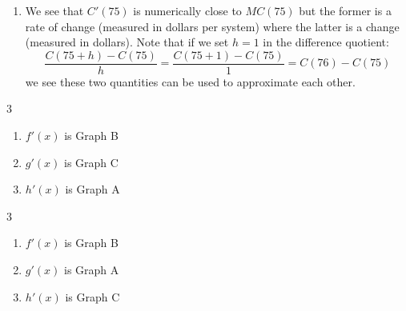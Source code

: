 \documentclass{ximera}
\begin{document}
\begin{enumerate}
\begin{enumerate}
\item  We see that $C'(75)$ is numerically close to $MC(75)$ but the former is a rate of change (measured in dollars per system) where the latter is a change (measured in dollars).  Note that if we set  $h = 1$ in the difference quotient:  \[\frac{C(75+h) - C(75)}{h} = \frac{C(75+1) - C(75)}{1} = C(76) - C(75)\] we see these two quantities can be used to approximate each other.

\end{enumerate}

\setcounter{HW}{\value{enumi}}
\end{enumerate}

\begin{multicols}{3}

\begin{enumerate}
\setcounter{enumi}{\value{HW}}

 \item $f'(x)$ is Graph B
 
 \item $g'(x)$ is Graph C
 
 
 \item $h'(x)$ is Graph A 

\setcounter{HW}{\value{enumi}}
\end{enumerate}

\end{multicols}


\begin{multicols}{3}

\begin{enumerate}
\setcounter{enumi}{\value{HW}}

 \item $f'(x)$ is Graph B
 
 \item $g'(x)$ is Graph A
 
 \item $h'(x)$ is Graph C

\setcounter{HW}{\value{enumi}}
\end{enumerate}

\end{multicols}
\end{document}
